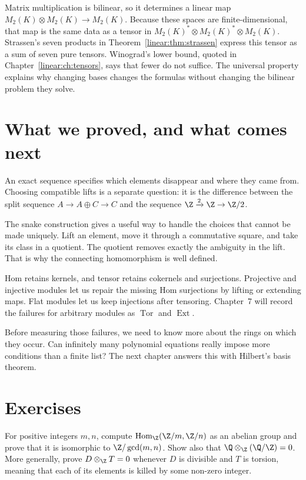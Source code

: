 \begin{beauty}
Matrix multiplication is bilinear, so it determines a linear map $M_2(K)\otimes M_2(K)\to M_2(K)$. Because these spaces are finite-dimensional, that map is the same data as a tensor in $M_2(K)^*\otimes M_2(K)^*\otimes M_2(K)$. Strassen's seven products in Theorem~\ref{linear:thm:strassen} express this tensor as a sum of seven pure tensors. Winograd's lower bound, quoted in Chapter~\ref{linear:ch:tensors}, says that fewer do not suffice. The universal property explains why changing bases changes the formulas without changing the bilinear problem they solve.
\end{beauty}

\section{What we proved, and what comes next}

An exact sequence specifies which elements disappear and where they came from. Choosing compatible lifts is a separate question: it is the difference between the split sequence $A\to A\oplus C\to C$ and the sequence $\Z\xrightarrow2\Z\to\Z/2$.

The snake construction gives a useful way to handle the choices that cannot be made uniquely. Lift an element, move it through a commutative square, and take its class in a quotient. The quotient removes exactly the ambiguity in the lift. That is why the connecting homomorphism is well defined.

Hom retains kernels, and tensor retains cokernels and surjections. Projective and injective modules let us repair the missing Hom surjections by lifting or extending maps. Flat modules let us keep injections after tensoring. Chapter~7 will record the failures for arbitrary modules as $\operatorname{Tor}$ and $\operatorname{Ext}$.

Before measuring those failures, we need to know more about the rings on which they occur. Can infinitely many polynomial equations really impose more conditions than a finite list? The next chapter answers this with Hilbert's basis theorem.

\section{Exercises}

\begin{exercise}[$\star$]\label{ex:zmzncomp}
For positive integers $m,n$, compute $\operatorname{Hom}_\Z(\Z/m,\Z/n)$ as an abelian group and prove that it is isomorphic to $\Z/\gcd(m,n)$. Show also that $\Q\otimes_\Z(\Q/\Z)=0$. More generally, prove $D\otimes_\Z T=0$ whenever $D$ is divisible and $T$ is torsion, meaning that each of its elements is killed by some non-zero integer.
\end{exercise}

